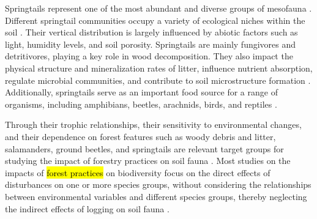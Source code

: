 Springtails represent one of the most abundant and diverse groups of mesofauna \citep{rusekBiodiversityCollembolaTheir1998}. 
Different springtail communities occupy a variety of ecological niches within the soil \citep{pongeVerticalDistributionCollembola2000}. 
Their vertical distribution is largely influenced by abiotic factors such as light, humidity levels, and soil porosity. 
Springtails are mainly fungivores and detritivores, playing a key role in wood decomposition. 
They also impact the physical structure and mineralization rates of litter, influence nutrient absorption, 
regulate microbial communities, and contribute to soil microstructure formation \citep{Petersen1982comparativeanalysis,Neher2012Linkinginvertebrate,Maass2015Functionalrole,Potapov2016Connectingtaxonomy}. 
Additionally, springtails serve as an important food source for a range of organisms, including amphibians, beetles, arachnids, birds, and reptiles \citep{Burton1975Energyflow,Bauer1982Predationcarabid,rusekBiodiversityCollembolaTheir1998}.

Through their trophic relationships, their sensitivity to environmental changes, and their dependence on forest features such as woody debris and litter, 
salamanders, ground beetles, and springtails are relevant target groups for studying the impact of forestry practices on soil fauna \citep{Salmon2008Relationshipssoil}. 
Most studies on the impacts of \hl{forest practices} on biodiversity focus on the direct effects of disturbances on one or more species groups, 
without considering the relationships between environmental variables and different species groups, thereby neglecting the indirect effects of logging on soil fauna \citep{josephIntegratingOccupancyModels2016,Pollierer2021Diversityfunctional,Kudrin2023metaanalysiseffects}. 

